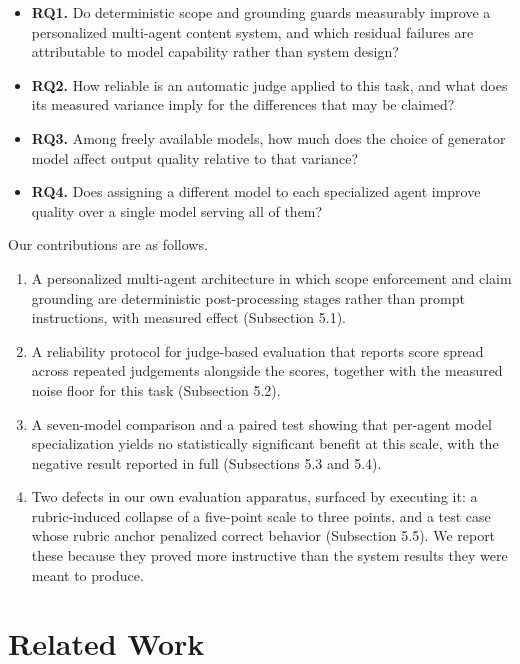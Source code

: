 \documentclass[9pt,twocolumn]{extarticle}
\begin{document}
\begin{itemize}
\item \textbf{RQ1.} Do deterministic scope and grounding guards measurably
      improve a personalized multi-agent content system, and which residual
      failures are attributable to model capability rather than system design?
\item \textbf{RQ2.} How reliable is an automatic judge applied to this task,
      and what does its measured variance imply for the differences that may
      be claimed?
\item \textbf{RQ3.} Among freely available models, how much does the choice of
      generator model affect output quality relative to that variance?
\item \textbf{RQ4.} Does assigning a different model to each specialized agent
      improve quality over a single model serving all of them?
\end{itemize}

Our contributions are as follows.

\begin{enumerate}
\item A personalized multi-agent architecture in which scope enforcement and
      claim grounding are deterministic post-processing stages rather than
      prompt instructions, with measured effect (Subsection 5.1).
\item A reliability protocol for judge-based evaluation that reports score
      spread across repeated judgements alongside the scores, together with
      the measured noise floor for this task (Subsection 5.2).
\item A seven-model comparison and a paired test showing that per-agent model
      specialization yields no statistically significant benefit at this
      scale, with the negative result reported in full (Subsections 5.3
      and 5.4).
\item Two defects in our own evaluation apparatus, surfaced by executing it: a
      rubric-induced collapse of a five-point scale to three points, and a
      test case whose rubric anchor penalized correct behavior
      (Subsection 5.5). We report these because they proved more instructive
      than the system results they were meant to produce.
\end{enumerate}

\section{Related Work}
\end{document}
